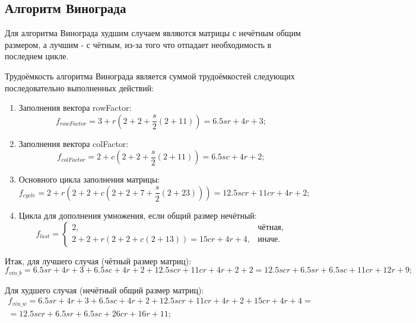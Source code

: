 \documentclass[12pt]{report}
\begin{document}
\subsection{Алгоритм Винограда}
Для алгоритма Винограда худшим случаем являются матрицы с нечётным общим размером, а лучшим - с чётным, из-за того что отпадает необходимость в последнем цикле.

Трудоёмкость алгоритма Винограда является суммой трудоёмкостей следующих последовательно выполненных действий:
\begin{enumerate}
	
	\item Заполнения вектора rowFactor:
	\begin{equation}
		f_{rowFactor} = 3 + r(2 + 2 + \frac{s}{2}(2 + 11)) = 6.5sr + 4r + 3;
	\end{equation}
	
	\item Заполнения вектора colFactor:
	\begin{equation}
		f_{colFactor} = 2 + c(2 + 2 + \frac{s}{2}(2 + 11)) = 6.5sc + 4r + 2;
	\end{equation}
	
	\item Основного цикла заполнения матрицы:
	\begin{equation}
		f_{cycle} = 2 + r(2 + 2 + c(2 + 2 + 7 + \frac{s}{2}(2 + 23))) = 12.5scr + 11cr + 4r + 2;
	\end{equation}
	
	\item Цикла для дополнения умножения, если общий размер нечётный:
	\begin{equation}
		f_{last} = \begin{cases}
			2, & \text{чётная,}\\
			2 + 2 + r(2 + 2 + c(2 + 13)) = 15cr + 4r + 4, & \text{иначе.}
		\end{cases}
	\end{equation}
\end{enumerate}
Итак, для лучшего случая (чётный размер матриц): 
\begin{equation}
	f_{vin\_b} = 6.5sr + 4r + 3 + 6.5sc + 4r + 2 + 12.5scr + 11cr + 4r + 2 + 2 = 12.5scr + 6.5sr + 6.5sc + 11cr + 12r + 9;
\end{equation}

Для худшего случая (нечётный общий размер матриц): 
\begin{eqnarray}
	f_{vin\_w} = 6.5sr + 4r + 3 + 6.5sc + 4r + 2 + 12.5scr + 11cr + 4r + 2 + 15cr + 4r + 4 =\\ = 12.5scr + 6.5sr + 6.5sc + 26cr + 16r + 11;
\end{eqnarray}
\end{document}
